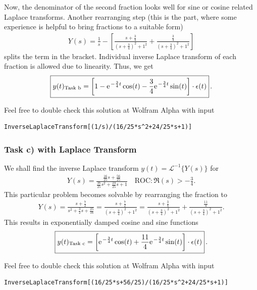 \documentclass[11pt,a4paper,DIV=12]{scrartcl}
\begin{document}
Now, the denominator of the second fraction looks well for sine or cosine related
Laplace transforms.
Another rearranging step (this is the part, where some experience
is helpful to bring fractions to a suitable form)
\begin{align}
Y(s) =
\frac{1}{s} - \left[\frac{s + \frac{3}{4}}{(s + \frac{3}{4})^2 + 1^2} +
\frac{\frac{3}{4}}{(s+\frac{3}{4})^2 + 1^2}\right]
\end{align}
splits the term in the bracket.
Individual inverse Laplace transform of each fraction is allowed due to
linearity. Thus, we get
\begin{align}
\label{eq:stepResponse_Laplace}
\boxed{y(t)_\text{Task b} =
\left[1
- \e^{-\frac{3}{4} t} \cos(t)
- \frac{3}{4}\e^{-\frac{3}{4} t} \sin(t) \right] \cdot \epsilon(t)}\,.
\end{align}

Feel free to double check this solution at Wolfram Alpha with input
\begin{verbatim}
InverseLaplaceTransform[(1/s)/(16/25*s^2+24/25*s+1)]
\end{verbatim}

\subsubsection{Task c) with Laplace Transform}
We shall find the inverse Laplace transform $y(t) = \mathcal{L}^{-1}\{Y(s)\}$
for
\begin{align}
Y(s) =
\frac{\frac{16}{25} s + \frac{56}{25}}{\frac{16}{25} s^2 + \frac{24}{25} s + 1}
\quad \text{ROC}: \Re(s) > -\frac{3}{4}.
\end{align}
This particular problem becomes solvable by rearranging the fraction to
\begin{align}
Y(s) =
\frac{s + \frac{7}{2}}{s^2 + \frac{3}{2} s + \frac{25}{16}} =
\frac{s + \frac{7}{2}}{(s + \frac{3}{4})^2 + 1^2}
=\frac{s + \frac{3}{4}}{(s + \frac{3}{4})^2 + 1^2}
+\frac{\frac{11}{4}}{(s + \frac{3}{4})^2 + 1^2}.
\end{align}
This results in exponentially damped cosine and sine functions
\begin{align}
\boxed{y(t)_\text{Task c} =
\left[\e^{-\frac{3}{4} t} \cos(t)
+\frac{11}{4}\e^{-\frac{3}{4} t} \sin(t) \right] \cdot \epsilon(t)}\,.
\end{align}

Feel free to double check this solution at Wolfram Alpha with input
\begin{verbatim}
InverseLaplaceTransform[(16/25*s+56/25)/(16/25*s^2+24/25*s+1)]
\end{verbatim}
\end{document}
